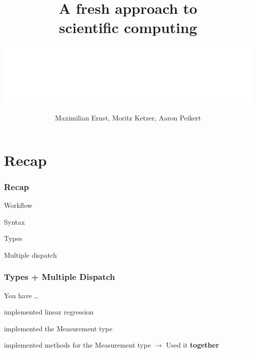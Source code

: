 \documentclass[notes]{beamer}
\title{\Huge A fresh approach to \\ scientific computing}
\date{Maximilian Ernst, Moritz Ketzer, Aaron Peikert}
\author{\includegraphics[width=.49\textwidth]{figures/mpib_logo/MPIB_Logo_EN_horizontal_RGB_White.png}}
\def\\{}%
\newenvironment{wideitemize}{
    \itemize\addtolength{\itemsep}{15pt}\addtolength{\topsep}{10pt}}{\enditemize}
\begin{document}
	\setcounter{showProgressBar}{0}
	\setcounter{showSlideNumbers}{0}

	{
    }

    {
	\frame{
	\titlepage}
	}

	\setcounter{showProgressBar}{0}
	\setcounter{showSlideNumbers}{0}

	\section{Recap}

    \begin{frame}
    \frametitle{Recap}
        \begin{wideitemize}
            \item Workflow
            \item Syntax
            \item Types
            \item Multiple dispatch
        \end{wideitemize}
    \end{frame}

    \begin{frame}
    \frametitle{Types + Multiple Dispatch}
    You have \ldots
    \vspace{1cm}
        \begin{wideitemize}
            \item implemented linear regression
            \item implemented the Measurement type
            \item implemented methods for the Measurement type
        \end{wideitemize}
    \vspace{1cm}
    $\rightarrow$ Used it \textbf{together}\\
    \end{frame}
\end{document}
